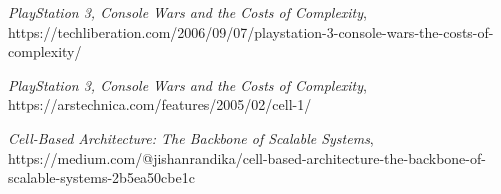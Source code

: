 \documentclass[10pt,compsoc]{IEEEtran}
\begin{document}
\begin{thebibliography}{1}
			{\it{PlayStation 3, Console Wars and the Costs of Complexity}},		
			https://techliberation.com/2006/09/07/playstation-3-console-wars-the-costs-of-complexity/\newline
			
			
			{\it{PlayStation 3, Console Wars and the Costs of Complexity}}, 			
			https://arstechnica.com/features/2005/02/cell-1/\newline
			
			{\it{Cell-Based Architecture: The Backbone of Scalable Systems}}, 			
			https://medium.com/@jishanrandika/cell-based-architecture-the-backbone-of-scalable-systems-2b5ea50cbe1c
			
		
		\end{thebibliography}
		
			
	
		
\end{document}
